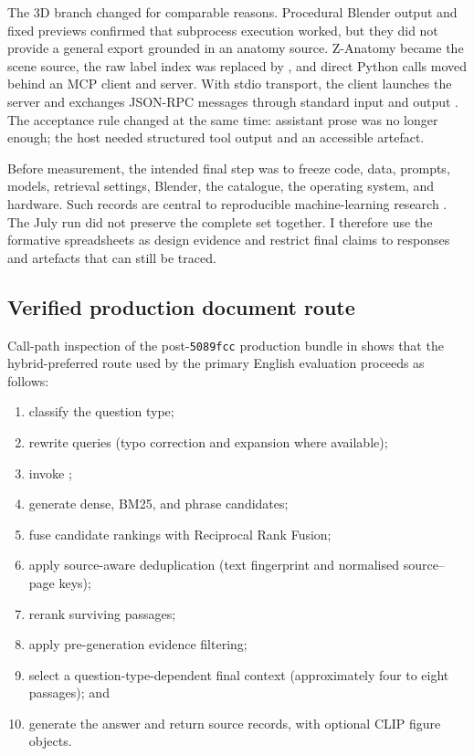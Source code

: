 The 3D branch changed for comparable reasons. Procedural Blender output and fixed previews confirmed that subprocess execution worked, but they did not provide a general export grounded in an anatomy source. Z-Anatomy became the scene source, the raw label index was replaced by , and direct Python calls moved behind an MCP client and server. With stdio transport, the client launches the server and exchanges JSON-RPC messages through standard input and output \parencite{mcp20250618}. The acceptance rule changed at the same time: assistant prose was no longer enough; the host needed structured tool output and an accessible artefact.

Before measurement, the intended final step was to freeze code, data, prompts, models, retrieval settings, Blender, the catalogue, the operating system, and hardware. Such records are central to reproducible machine-learning research \parencite{pineau2021}. The July run did not preserve the complete set together. I therefore use the formative spreadsheets as design evidence and restrict final claims to responses and artefacts that can still be traced.

\subsection{Verified production document route}
\label{subsec:verified-production-route}

Call-path inspection of the post-\texttt{5089fcc} production bundle in  shows that the hybrid-preferred route used by the primary English evaluation proceeds as follows:

\begin{enumerate}[leftmargin=*,itemsep=0.15em,topsep=0.3em]
  \item classify the question type;
  \item rewrite queries (typo correction and expansion where available);
  \item invoke ;
  \item generate dense, BM25, and phrase candidates;
  \item fuse candidate rankings with Reciprocal Rank Fusion;
  \item apply source-aware deduplication (text fingerprint and normalised source--page keys);
  \item rerank surviving passages;
  \item apply pre-generation evidence filtering;
  \item select a question-type-dependent final context (approximately four to eight passages); and
  \item generate the answer and return source records, with optional CLIP figure objects.
\end{enumerate}

